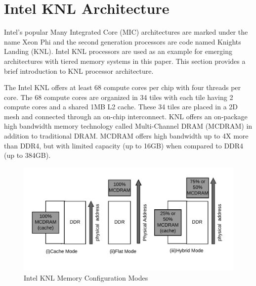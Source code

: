 \section{Intel KNL Architecture}
\label{src:knl}

Intel's popular Many Integrated Core (MIC) architectures are marked
under the name Xeon Phi and the second generation processors are
code
named Knights Landing (KNL). Intel KNL processors are used as an
example for emerging architectures with tiered memory systems in
this paper. This section provides a brief introduction to KNL
processor architecture.

The Intel KNL offers at least 68 compute cores per chip with four
threads per core. %
The 68 compute cores are organized
in 34 tiles with each tile having 2 compute cores and a shared 1MB
L2 cache. These 34 tiles are placed in a 2D mesh and connected through
an on-chip interconnect. KNL offers an on-package high bandwidth memory
technology called Multi-Channel DRAM (MCDRAM) in addition to traditional
DRAM. MCDRAM offers high bandwidth up to 4X more than DDR4, but with
limited capacity (up to 16GB) when compared to DDR4 (up to 384GB).

\begin{figure}[!h]
    \vspace{-35pt}
    \hspace*{5mm}
    \includegraphics[scale=0.20]{image/mem-mode.png}
    \vspace{-25pt}
    \caption{Intel KNL Memory Configuration Modes}
    \vspace{-25pt}
    \label{fig:memmode}
\end{figure}

